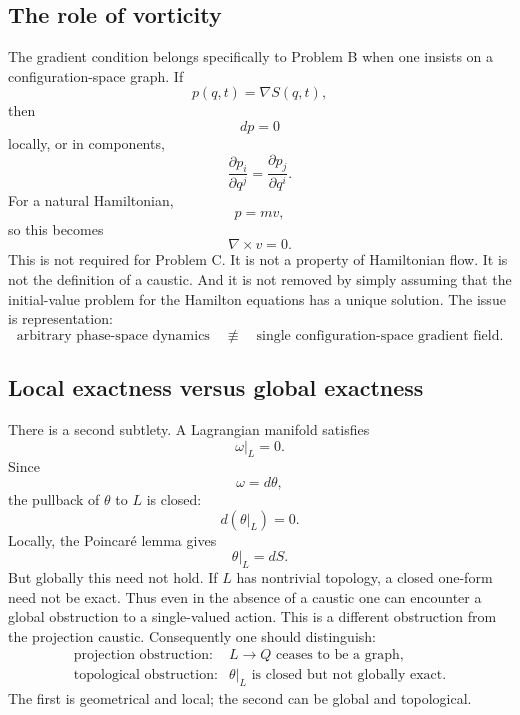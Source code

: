 \subsection{The role of vorticity}
The gradient condition belongs specifically to Problem B when one insists on
a configuration-space graph.
If
\begin{equation}
p(q,t)=\nabla S(q,t),
\end{equation}
then
\begin{equation}
dp=0
\end{equation}
locally, or in components,
\begin{equation}
\frac{\partial p_i}{\partial q^j}
=
\frac{\partial p_j}{\partial q^i}.
\end{equation}
For a natural Hamiltonian,
\begin{equation}
p=mv,
\end{equation}
so this becomes
\begin{equation}
\nabla\times v=0.
\end{equation}
This is not required for Problem C.
It is not a property of Hamiltonian flow.
It is not the definition of a caustic.
And it is not removed by simply assuming that the initial-value problem for
the Hamilton equations has a unique solution.
The issue is representation:
\begin{equation}
\boxed{
\text{arbitrary phase-space dynamics}
\quad\not\equiv\quad
\text{single configuration-space gradient field}.
}
\end{equation}
\subsection{Local exactness versus global exactness}
There is a second subtlety.
A Lagrangian manifold satisfies
\begin{equation}
\omega|_L=0.
\end{equation}
Since
\begin{equation}
\omega=d\theta,
\end{equation}
the pullback of \(\theta\) to \(L\) is closed:
\begin{equation}
d(\theta|_L)=0.
\end{equation}
Locally, the Poincaré lemma gives
\begin{equation}
\theta|_L=dS.
\end{equation}
But globally this need not hold.  If \(L\) has nontrivial topology, a closed
one-form need not be exact.
Thus even in the absence of a caustic one can encounter a global obstruction
to a single-valued action.
This is a different obstruction from the projection caustic.
Consequently one should distinguish:
\begin{equation}
\boxed{
\begin{array}{ll}
\text{projection obstruction:}
&
L\to Q\text{ ceases to be a graph},
\\[1mm]
\text{topological obstruction:}
&
\theta|_L\text{ is closed but not globally exact}.
\end{array}}
\end{equation}
The first is geometrical and local; the second can be global and topological.
